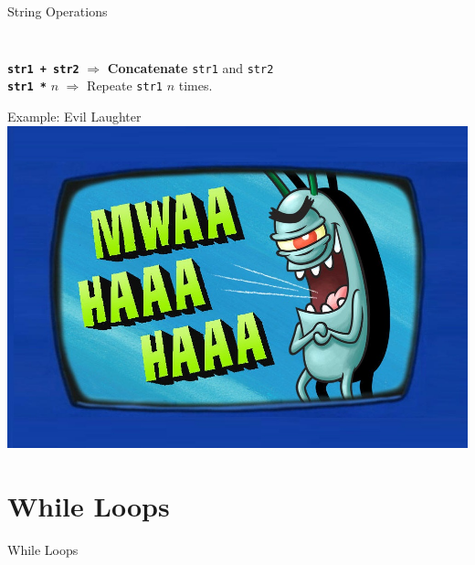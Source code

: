         \begin{frame}{String Operations}
            \large
            \pause
            \inputminted[frame=single,framesep=2pt, lastline=4]{python3}{code-examples/string_operations.py}
            \pause
            \inputminted[frame=single,framesep=2pt, firstline=6]{python3}{code-examples/string_operations.py}
            \pause
            \LARGE
            \texttt{\textbf{str1 + str2}} $\Rightarrow$ \textbf{Concatenate} \texttt{str1} and \texttt{str2}\\
            \pause
            \texttt{\textbf{str1 *}} $n$ $\Rightarrow$  Repeate \texttt{str1} $n$ times.
        \end{frame}

        \begin{frame}{Example: Evil Laughter}
            \centering
            \includegraphics[height=0.8\textheight]{images/evil_laugh.jpg}
        \end{frame}

    \section{While Loops}
        \begin{frame}{While Loops}
            \begin{columns}
                \begin{column}{0.5\textwidth}
                    \inputminted[frame=single,framesep=2pt]{python3}{code-examples/while1.py}
                \end{column}
            \pause 
                \begin{column}{0.5\textwidth}
                    \inputminted[frame=single,framesep=2pt]{python3}{code-examples/while2.py}
                    \pause
                    \inputminted[frame=single,framesep=2pt]{python3}{code-examples/while3.py}
                \end{column} 
            \end{columns}
        \end{frame}
        

